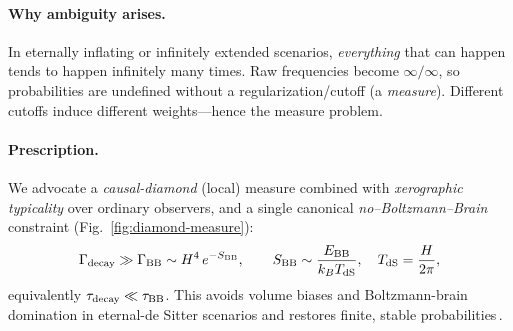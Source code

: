 \documentclass[12pt]{article}
\theoremstyle{remark}
\begin{document}
\paragraph{Why ambiguity arises.} In eternally inflating or infinitely extended scenarios, \emph{everything} that can happen tends to happen infinitely many times. Raw frequencies become $\infty/\infty$, so probabilities are undefined without a regularization/cutoff (a \emph{measure}). Different cutoffs induce different weights---hence the measure problem.

\paragraph{Prescription.} We advocate a \emph{causal-diamond} (local) measure combined with \emph{xerographic typicality} over ordinary observers, and a single canonical \emph{no--Boltzmann--Brain} constraint (Fig.~\ref{fig:diamond-measure}):
\begin{equation}
 \Gamma_{\rm decay} \gg \Gamma_{\rm BB} \sim H^4\,e^{-S_{\rm BB}},\qquad 
 S_{\rm BB}\sim \frac{E_{\rm BB}}{k_B T_{\rm dS}},\quad T_{\rm dS}=\frac{H}{2\pi},
\end{equation}
equivalently $\tau_{\rm decay}\ll \tau_{\rm BB}$. This avoids volume biases and Boltzmann-brain domination in eternal-de Sitter scenarios and restores finite, stable probabilities\,\cite{DysonKlebanSusskind2002,Page2007}.
\end{document}
